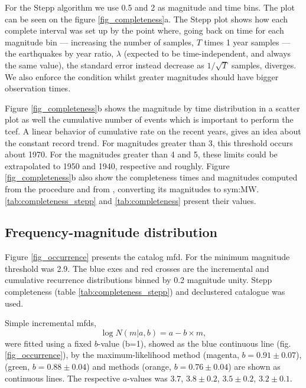 \documentclass[draft, grl]{agutex}
\begin{document}
\begin{article}
For the Stepp algorithm we use 0.5 and 2 as magnitude and time bins. The plot can be seen on the figure \ref{fig_completeness}a. The Stepp plot shows how each complete interval was set up by the point where, going back on time for each magnitude bin  --- increasing the number of samples, $T$ times 1 year samples --- the earthquakes by year ratio, $\lambda$ (expected to be time-independent, and always the same value), the standard error instead decrease as $1/\sqrt{T}$ samples, diverges. We also enforce the condition whilst greater magnitudes should have bigger observation times.

Figure \ref{fig_completeness}b shows the magnitude by time distribution in a scatter plot as well the cumulative number of events which is important to perform the \gls{tcef}. A linear behavior of cumulative rate on the recent years, gives an idea about the constant record trend. For magnitudes greater than 3, this threshold occurs about 1970. For the magnitudes greater than 4 and 5, these limits could be extrapolated to 1950 and 1940, respective and roughly. Figure \ref{fig_completeness}b also show the completeness times and magnitudes computed from the \citet{stepp_1972} procedure and from \citet{assumpcao_et_al_2014}, converting its magnitudes to \gls{sym:MW}. \ref{tab:completeness_stepp} and \ref{tab:completeness} present their values.


\subsection{Frequency-magnitude distribution}

Figure \ref{fig_occurrence} presents the catalog \gls{mfd}. For the minimum magnitude threshold was 2.9. The blue exes and red crosses are the incremental and cumulative recurrence distributions binned by 0.2 magnitude unity. Stepp completeness (table \ref{tab:completeness_stepp}) and \citet{bsb_2014} declustered catalogue was used. 

Simple \citet{gutenberg_richter_1944} incremental \glspl{mfd},
\begin{equation}
\log{N}(m|a,b) = a - b \times m,
\end{equation}
were fitted using a fixed $b$-value (b=1), showed as the blue continuous line (fig. \ref{fig_occurrence}), by the maximum-likelihood method (magenta, $b=0.91\pm0.07$), \citet{weichert_1980} (green, $b=0.88\pm0.04$) and \citet{kijko_2012} methods (orange, $b=0.76\pm0.04$) are shown as continuous lines. The respective $a$-values was $3.7$, $3.8\pm0.2$, $3.5\pm0.2$, $3.2\pm0.1$.


\end{article}
\end{document}
